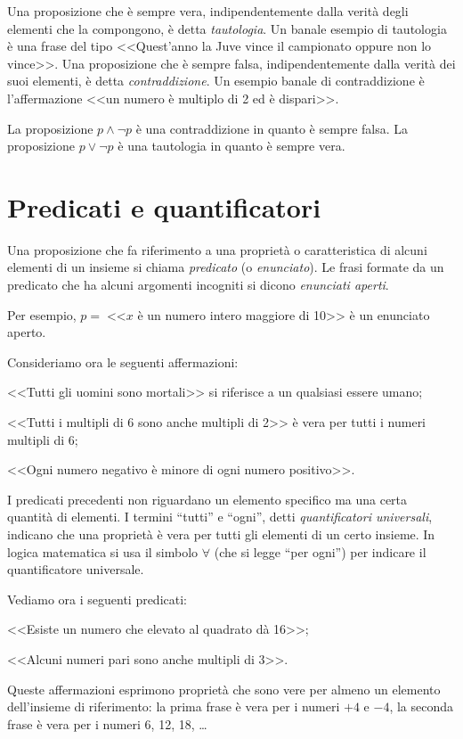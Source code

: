 Una proposizione che è sempre vera, indipendentemente dalla verità degli elementi che la compongono, è detta \emph{tautologia}. Un banale esempio di tautologia è una frase del tipo <<Quest'anno la Juve vince il campionato oppure non lo vince>>. Una proposizione che è sempre falsa, indipendentemente dalla verità dei suoi elementi, è detta \emph{contraddizione}. Un esempio banale di contraddizione è l'affermazione <<un numero è multiplo di 2 ed è dispari>>.

\begin{exrig}
\begin{esempio}
	La proposizione $p\wedge \neg p$ è una contraddizione in quanto è sempre falsa.
	La proposizione $p\vee \neg p$ è una tautologia in quanto è sempre vera.
\end{esempio}
\end{exrig}


\section{Predicati e quantificatori}

Una proposizione che fa riferimento a una proprietà o caratteristica di alcuni elementi di un insieme si chiama \emph{predicato} (o \emph{enunciato}). Le frasi formate da un predicato che ha alcuni argomenti incogniti si dicono \emph{enunciati aperti}.

Per esempio, $p =\;$<<$x$ è un numero intero maggiore di 10>> è un enunciato aperto.

Consideriamo ora le seguenti affermazioni:
\begin{itemize*}
\item <<Tutti gli uomini sono mortali>> si riferisce a un qualsiasi essere umano;
\item <<Tutti i multipli di 6 sono anche multipli di 2>> è vera per tutti i numeri multipli di 6;
\item <<Ogni numero negativo è minore di ogni numero positivo>>.
\end{itemize*}
I predicati precedenti non riguardano un elemento specifico ma una certa quantità di elementi. I termini ``tutti'' e ``ogni'', detti \emph{quantificatori universali}, indicano che una proprietà è vera per tutti gli elementi di un certo insieme. In logica matematica si usa il simbolo $\forall$ (che si legge ``per ogni'') per indicare il quantificatore universale.

Vediamo ora i seguenti predicati:
\begin{itemize*}
\item <<Esiste un numero che elevato al quadrato dà 16>>;
\item <<Alcuni numeri pari sono anche multipli di 3>>.
\end{itemize*}
Queste affermazioni esprimono proprietà che sono vere per almeno un elemento dell'insieme di riferimento: la prima frase è vera per i numeri $+4$ e $-4$, la seconda frase è vera per i numeri 6, 12, 18, \ldots{}

